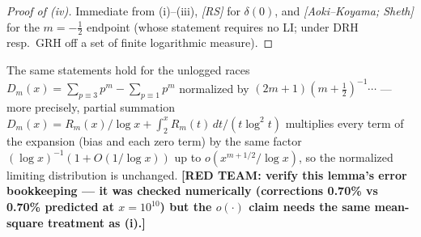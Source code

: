 \begin{proof}[Proof of (iv)]
Immediate from (i)--(iii), \emph{[RS]} for $\delta(0)$, and
\emph{[Aoki--Koyama; Sheth]} for the $m=-\tfrac12$ endpoint (whose
statement requires no LI; under DRH resp.\ GRH off a set of finite
logarithmic measure).
\end{proof}

\begin{remark}
The same statements hold for the unlogged races
$D_m(x)=\sum_{p\equiv3}p^m-\sum_{p\equiv1}p^m$ normalized by
$(2m+1)(m+\tfrac12)^{-1}\cdots$ --- more precisely, partial summation
$D_m(x)=R_m(x)/\log x+\int_2^x R_m(t)\,dt/(t\log^2t)$ multiplies every
term of the expansion (bias and each zero term) by the same factor
$(\log x)^{-1}(1+O(1/\log x))$ up to $o(x^{m+1/2}/\log x)$, so the
normalized limiting distribution is unchanged. \textbf{[RED TEAM:
verify this lemma's error bookkeeping --- it was checked numerically
(corrections 0.70\% vs 0.70\% predicted at $x=10^{10}$) but the
$o(\cdot)$ claim needs the same mean-square treatment as (i).]}
\end{remark}

